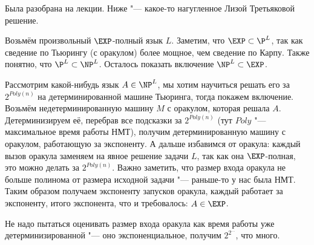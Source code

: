 	Была разобрана на лекции.
	Ниже "--- какое-то нагугленное Лизой Третьяковой решение.

	Возьмём произвольный $\EXP$-полный язык $L$.
	Заметим, что $\EXP \subset \P^L$, так как сведение по Тьюрингу (с оракулом) более мощное, чем сведение по Карпу.
	Также понятно, что $\P^L \subset \NP^L$.
	Осталось показать включение $\NP^L \subset \EXP$.

	Рассмотрим какой-нибудь язык $A \in \NP^L$, мы хотим научиться решать его за $2^{Poly(n)}$
	на детерминированной машине Тьюринга, тогда покажем включение.
	Возьмём недетерминированную машину $M$ с оракулом, которая решала $A$.
	Детерминизируем её, перебрав все подсказки за $2^{Poly(n)}$ (тут $Poly$ "--- максимальное время работы НМТ),
	получим детерминированную машину с оракулом, работающую за экспоненту.
	А дальше избавимся от оракула: каждый вызов оракула заменяем на явное решение задачи $L$,
	так как она $\EXP$-полная, это можно делать за $2^{Poly(n)}$.
	Важно заметить, что размер входа оракула не больше полинома от размера исходной задачи "--- раньше-то у нас была НМТ.
	Таким образом получаем экспоненту запусков оракула, каждый работает за экспоненту, итого экспонента,
	что и требовалось: $A \in \EXP$.
	\begin{Rem}
		Не надо пытаться оценивать размер входа оракула как время работы уже детерминизированной "--- оно экспоненциальное, получим
		$2^{2^{\dots}}$, что много.
	\end{Rem}
